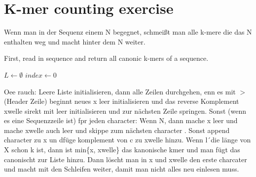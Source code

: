 \documentclass[main.tex]{subfiles}
\begin{document}
\section{K-mer counting exercise}
\begin{tipp}[title=Vorgehen]
Wenn man in der Sequenz einem N begegnet, schmeißt man alle k-mere die das N enthalten weg und macht hinter dem N weiter. 
\end{tipp}
First, read in sequence and return all canonic k-mers of a sequence.
\begin{algorithm}
\caption{Reading in k-mers}
$L \longleftarrow \emptyset$\;
$index \longleftarrow 0$\; 
\end{algorithm}
Oee rauch: 
Leere Liste initialisieren, dann alle Zeilen durchgehen, enn es mit $>$ (Header Zeile) beginnt neues x leer initialisieren und das reverse Komplement xwelle sirekt mit leer initialisieren und zur nächsten Zeile springen. Sonst (wenn es eine Sequenzzeile ist) fpr jeden character: Wenn N,  dann mache x leer und mache xwelle auch leer und skippe zum nächsten character . Sonst append character zu x un dfüge komplement von c zu xwelle hinzu. Wenn l´die länge von X schon k ist, dann  ist min\{x, xwelle\} das kanonische kmer und man fügt das canonischt zur Liste hinzu. Dann löscht man in x und  xwelle den erste charcater und macht mit den Schleifen weiter, damit man nicht alles neu einlesen muss. 


\begin{algorithm}
 \caption{\backslash caption}
 
\end{algorithm}
\end{document}
